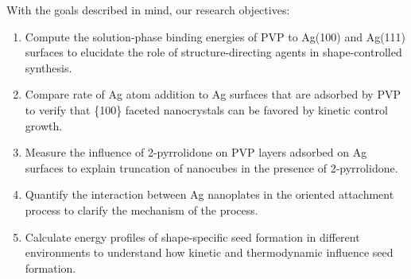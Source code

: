 With the goals described in mind, our research objectives:
\begin{enumerate}
\item Compute the solution-phase binding energies of PVP to Ag(100) and Ag(111) surfaces to elucidate the role of structure-directing agents in shape-controlled synthesis.
\item Compare rate of Ag atom addition to Ag surfaces that are adsorbed by PVP to verify that \{100\} faceted nanocrystals can be favored by kinetic control growth.
\item Measure the influence of 2-pyrrolidone on PVP layers adsorbed on Ag surfaces to explain truncation of nanocubes in the presence of 2-pyrrolidone.
\item Quantify the interaction between Ag nanoplates in the oriented attachment process to clarify the mechanism of the process.
\item Calculate energy profiles of shape-specific seed formation in different environments to understand how kinetic and thermodynamic influence seed formation.
\end{enumerate}

  
  
  